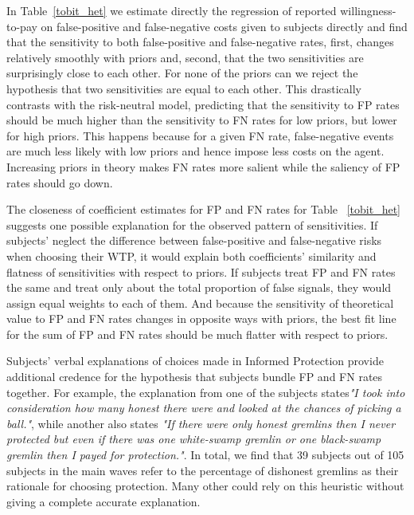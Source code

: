 \documentclass[12pt,a4paper]{article}
\begin{document}
\label{tobit_het}

In Table~\ref{tobit_het} we estimate directly the regression of reported willingness-to-pay on false-positive and false-negative costs given to subjects directly and find that the sensitivity to both false-positive and false-negative rates, first, changes relatively smoothly with priors and, second, that the two sensitivities are surprisingly close to each other. For none of the priors can we reject the hypothesis that two sensitivities are equal to each other. This drastically contrasts with the risk-neutral model, predicting that the sensitivity to FP rates should be much higher than the sensitivity to FN rates for low priors, but lower for high priors. This happens because for a given FN rate, false-negative events are much less likely with low priors and hence impose less costs on the agent. Increasing priors in theory makes FN rates more salient while the saliency of FP rates should go down. 

The closeness of coefficient estimates for FP and FN rates for Table ~\ref{tobit_het} suggests one possible explanation for the observed pattern of sensitivities. If subjects' neglect the difference between false-positive and false-negative risks when choosing their WTP, it would explain both coefficients' similarity and flatness of sensitivities with respect to priors. If subjects treat FP and FN rates the same and treat only about the total proportion of false signals, they would assign equal weights to each of them. And because the sensitivity of theoretical value to FP and FN rates changes in opposite ways with priors, the best fit line for the sum of FP and FN rates should be much flatter with respect to priors.

Subjects' verbal explanations of choices made in Informed Protection provide additional credence for the hypothesis that subjects bundle FP and FN rates together. For example, the explanation from one of the subjects states\textit{"I took into consideration how many honest there were and looked at the chances of picking a ball."}, while another also states \textit{"If there were only honest gremlins then I never protected but even if there was one white-swamp gremlin or one black-swamp gremlin then I payed for protection."}. In total, we find that 39 subjects out of 105 subjects in the main waves refer to the percentage of dishonest gremlins as their rationale for choosing protection. Many other could rely on this heuristic without giving a complete accurate explanation.
\end{document}
